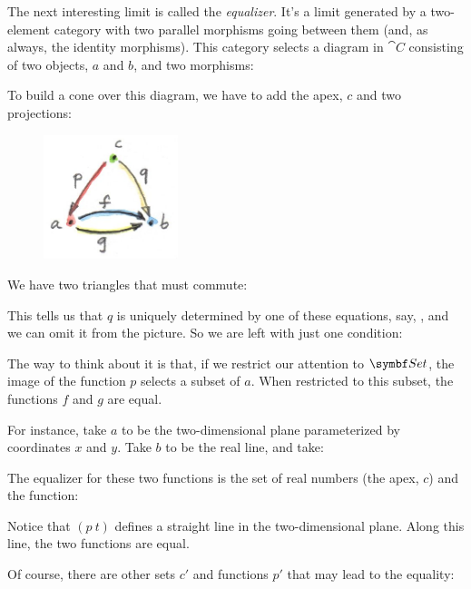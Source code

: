 The next interesting limit is called the \emph{equalizer}. It's a limit
generated by a two-element category with two parallel morphisms going
between them (and, as always, the identity morphisms). This category
selects a diagram in $\cat{C}$ consisting of two objects, $a$ and
$b$, and two morphisms:


To build a cone over this diagram, we have to add the apex, $c$
and two projections:


\begin{figure}[H]
  \centering
  \includegraphics[width=0.35\textwidth]{images/equalizercone.jpg}
\end{figure}

\noindent
We have two triangles that must commute:


This tells us that $q$ is uniquely determined by one of these
equations, say, , and we can omit it from the
picture. So we are left with just one condition:


The way to think about it is that, if we restrict our attention to
$\Set$, the image of the function $p$ selects a subset of
$a$. When restricted to this subset, the functions $f$ and
$g$ are equal.

For instance, take $a$ to be the two-dimensional plane
parameterized by coordinates $x$ and $y$. Take $b$
to be the real line, and take:


The equalizer for these two functions is the set of real numbers (the
apex, $c$) and the function:


Notice that $(p~t)$ defines a straight line in the
two-dimensional plane. Along this line, the two functions are equal.

Of course, there are other sets $c'$ and functions
$p'$ that may lead to the equality:

